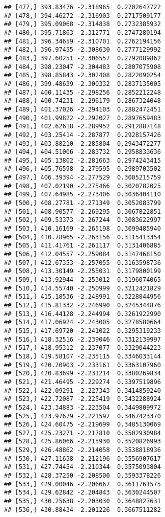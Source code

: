 \documentclass[]{book}
\theoremstyle{definition}
\theoremstyle{definition}
\theoremstyle{definition}
\theoremstyle{remark}
\begin{document}
\begin{verbatim}
## [477,] 393.83476 -2.318965  0.2702647722
## [478,] 394.46272 -2.316903  0.2717509177
## [479,] 395.09068 -2.314838  0.2732385932
## [480,] 395.71863 -2.312771  0.2747280194
## [481,] 396.34659 -2.310701  0.2762194156
## [482,] 396.97455 -2.308630  0.2777129992
## [483,] 397.60251 -2.306557  0.2792089862
## [484,] 398.23047 -2.304483  0.2807075908
## [485,] 398.85843 -2.302408  0.2822090254
## [486,] 399.48639 -2.300332  0.2837135005
## [487,] 400.11435 -2.298256  0.2852212248
## [488,] 400.74231 -2.296179  0.2867324048
## [489,] 401.37026 -2.294103  0.2882472451
## [490,] 401.99822 -2.292027  0.2897659483
## [491,] 402.62618 -2.289952  0.2912887148
## [492,] 403.25414 -2.287877  0.2928157426
## [493,] 403.88210 -2.285804  0.2943472277
## [494,] 404.51006 -2.283732  0.2958833636
## [495,] 405.13802 -2.281663  0.2974243415
## [496,] 405.76598 -2.279595  0.2989703502
## [497,] 406.39394 -2.277529  0.3005215759
## [498,] 407.02190 -2.275466  0.3020782025
## [499,] 407.64985 -2.273406  0.3036404110
## [500,] 408.27781 -2.271349  0.3052083799
## [501,] 408.90577 -2.269295  0.3067822851
## [502,] 409.53373 -2.267244  0.3083622997
## [503,] 410.16169 -2.265198  0.3099485940
## [504,] 410.78965 -2.263156  0.3115413354
## [505,] 411.41761 -2.261117  0.3131406885
## [506,] 412.04557 -2.259084  0.3147468150
## [507,] 412.67353 -2.257055  0.3163598736
## [508,] 413.30149 -2.255031  0.3179800199
## [509,] 413.92944 -2.253012  0.3196074065
## [510,] 414.55740 -2.250999  0.3212421829
## [511,] 415.18536 -2.248991  0.3228844956
## [512,] 415.81332 -2.246990  0.3245344876
## [513,] 416.44128 -2.244994  0.3261922990
## [514,] 417.06924 -2.243005  0.3278580664
## [515,] 417.69720 -2.241022  0.3295319233
## [516,] 418.32516 -2.239046  0.3312139997
## [517,] 418.95312 -2.237077  0.3329044223
## [518,] 419.58107 -2.235115  0.3346033144
## [519,] 420.20903 -2.233161  0.3363107960
## [520,] 420.83699 -2.231214  0.3380269834
## [521,] 421.46495 -2.229274  0.3397519896
## [522,] 422.09291 -2.227343  0.3414859240
## [523,] 422.72087 -2.225419  0.3432288924
## [524,] 423.34883 -2.223504  0.3449809972
## [525,] 423.97679 -2.221597  0.3467423370
## [526,] 424.60475 -2.219699  0.3485130069
## [527,] 425.23271 -2.217810  0.3502930984
## [528,] 425.86066 -2.215930  0.3520826993
## [529,] 426.48862 -2.214058  0.3538818936
## [530,] 427.11658 -2.212196  0.3556907617
## [531,] 427.74454 -2.210344  0.3575093804
## [532,] 428.37250 -2.208500  0.3593378226
## [533,] 429.00046 -2.206667  0.3611761575
## [534,] 429.62842 -2.204843  0.3630244507
## [535,] 430.25638 -2.203030  0.3648827631
## [536,] 430.88434 -2.201226  0.3667511282

\end{verbatim}
\end{document}

